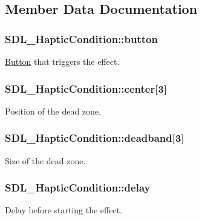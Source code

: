 \subsection{Member Data Documentation}
\hypertarget{struct_s_d_l___haptic_condition_acd35a9d432ad122bf7824b16974eac7a}{}
\subsubsection[{button}]{ S\+D\+L\+\_\+\+Haptic\+Condition\+::button}\label{struct_s_d_l___haptic_condition_acd35a9d432ad122bf7824b16974eac7a}
\hyperlink{class_button}{Button} that triggers the effect. \hypertarget{struct_s_d_l___haptic_condition_a8a71ec28ff5ab85246cbc59736aa2c53}{}
\subsubsection[{center}]{ S\+D\+L\+\_\+\+Haptic\+Condition\+::center\mbox{[}3\mbox{]}}\label{struct_s_d_l___haptic_condition_a8a71ec28ff5ab85246cbc59736aa2c53}
Position of the dead zone. \hypertarget{struct_s_d_l___haptic_condition_af684c8eeeb719739a32723c00c5a2bbd}{}
\subsubsection[{deadband}]{ S\+D\+L\+\_\+\+Haptic\+Condition\+::deadband\mbox{[}3\mbox{]}}\label{struct_s_d_l___haptic_condition_af684c8eeeb719739a32723c00c5a2bbd}
Size of the dead zone. \hypertarget{struct_s_d_l___haptic_condition_aad40417980530ca8d80c62ba864a090b}{}
\subsubsection[{delay}]{ S\+D\+L\+\_\+\+Haptic\+Condition\+::delay}\label{struct_s_d_l___haptic_condition_aad40417980530ca8d80c62ba864a090b}
Delay before starting the effect. \hypertarget{struct_s_d_l___haptic_condition_a728507d30d18998949313de3a25e5581}{}
